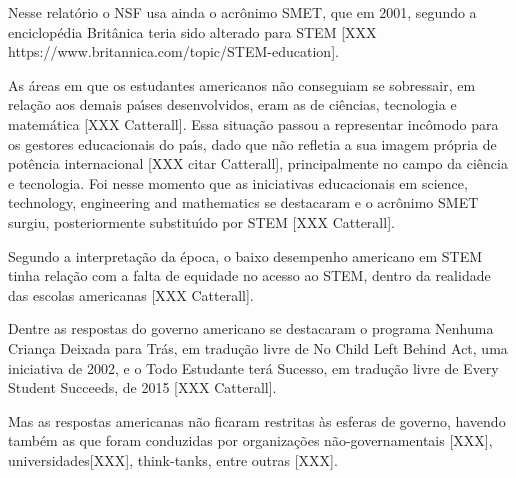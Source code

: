 \documentclass[
12pt,		%
openright,	%
twoside,  %
a4paper,			%
chapter=TITLE,		%
english,			%
french,				%
spanish,			%
brazil				%
]{USPSC-classe/USPSC_RedarTex}
\begin{document}
Nesse relat\'orio o NSF usa ainda o acr\^onimo SMET, que em 2001, segundo a enciclop\'edia Brit\^anica teria sido alterado para STEM [XXX https://www.britannica.com/topic/STEM-education].










As \'areas em que os estudantes americanos n\~ao conseguiam se sobressair, em rela\c{c}\~ao aos demais pa\'{\i}ses desenvolvidos, eram as de ci\^encias, tecnologia e matem\'atica [XXX Catterall]. Essa situa\c{c}\~ao passou a representar inc\^omodo para os gestores educacionais do pa\'{\i}s, dado que n\~ao refletia a sua imagem pr\'opria de pot\^encia internacional [XXX citar Catterall], principalmente no campo da ci\^encia e tecnologia. Foi nesse momento que as iniciativas educacionais em \textquotedbl science, technology, engineering and mathematics se destacaram e o acr\^onimo SMET surgiu, posteriormente substitu\'{\i}do por STEM [XXX  Catterall].










Segundo a interpreta\c{c}\~ao da \'epoca, o baixo desempenho americano em STEM tinha rela\c{c}\~ao com a falta de equidade no acesso ao STEM, dentro da realidade das escolas americanas [XXX Catterall].










Dentre as respostas do governo americano se destacaram o programa \textquotedbl Nenhuma Crian\c{c}a Deixada para Tr\'as, em tradu\c{c}\~ao livre de \textquotedbl No Child Left Behind Act, uma iniciativa de 2002, e o \textquotedbl Todo Estudante ter\'a Sucesso, em tradu\c{c}\~ao livre de \textquotedbl Every Student Succeeds, de 2015 [XXX Catterall].










Mas as respostas americanas n\~ao ficaram restritas \`as esferas de governo, havendo tamb\'em as que foram conduzidas por organiza\c{c}\~oes n\~ao-governamentais [XXX], universidades[XXX], think-tanks, entre outras [XXX].
\end{document}
